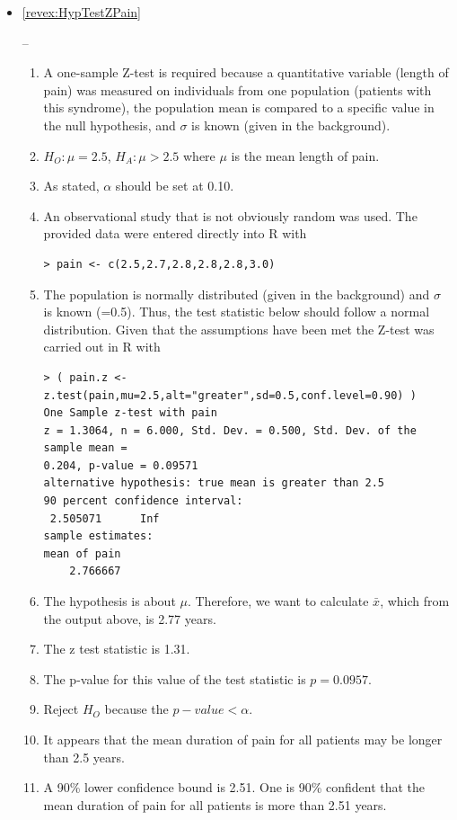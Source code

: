\documentclass[10pt,openany]{book}\usepackage[]{graphicx}\usepackage[]{color}
\makeatletter
\newenvironment{kframe}{%
 \def\at@end@of@kframe{}%
 \ifinner\ifhmode%
  \def\at@end@of@kframe{\end{minipage}}%
  \begin{minipage}{\columnwidth}%
 \fi\fi%
 \def\FrameCommand##1{\hskip\@totalleftmargin \hskip-\fboxsep
 \colorbox{shadecolor}{##1}\hskip-\fboxsep
     \hskip-\linewidth \hskip-\@totalleftmargin \hskip\columnwidth}%
 \MakeFramed {\advance\hsize-\width
   \@totalleftmargin\z@ \linewidth\hsize
   \@setminipage}}%
 {\par\unskip\endMakeFramed%
 \at@end@of@kframe}
\newenvironment{knitrout}{}{} %
\makeatother
\begin{document}
\begin{itemize}
  \item \hypertarget{ans:HypTestZPain}{\ref{revex:HypTestZPain}} --
    \begin{enumerate}
      \item A one-sample Z-test is required because a quantitative variable (length of pain) was measured on individuals from one population (patients with this syndrome), the population mean is compared to a specific value in the null hypothesis, and $\sigma$ is known (given in the background).
      \item $H_{O}:\mu=2.5$, $H_{A}:\mu>2.5$ where $\mu$ is the mean length of pain.
      \item As stated, $\alpha$ should be set at 0.10.
      \item An observational study that is not obviously random was used.  The provided data were entered directly into R with
\begin{knitrout}
\color{fgcolor}\begin{kframe}
\begin{verbatim}
> pain <- c(2.5,2.7,2.8,2.8,2.8,3.0)
\end{verbatim}
\end{kframe}
\end{knitrout}
      \item The population is normally distributed (given in the background) and $\sigma$ is known (=0.5).  Thus, the test statistic below should follow a normal distribution.  Given that the assumptions have been met the Z-test was carried out in R with
\begin{knitrout}
\color{fgcolor}\begin{kframe}
\begin{verbatim}
> ( pain.z <- z.test(pain,mu=2.5,alt="greater",sd=0.5,conf.level=0.90) )
One Sample z-test with pain 
z = 1.3064, n = 6.000, Std. Dev. = 0.500, Std. Dev. of the sample mean =
0.204, p-value = 0.09571
alternative hypothesis: true mean is greater than 2.5 
90 percent confidence interval:
 2.505071      Inf 
sample estimates:
mean of pain 
    2.766667 
\end{verbatim}
\end{kframe}
\end{knitrout}
      \item The hypothesis is about $\mu$.  Therefore, we want to calculate $\bar{x}$, which from the output above, is 2.77 years.
      \item The z test statistic is 1.31.
      \item The p-value for this value of the test statistic is $p=0.0957$.
      \item Reject $H_{O}$ because the $p-value<\alpha$.
      \item It appears that the mean duration of pain for all patients may be longer than 2.5 years.
      \item A 90\% lower confidence bound is 2.51.  One is 90\% confident that the mean duration of pain for all patients is more than 2.51 years.
    \end{enumerate}


\end{itemize}
\end{document}
